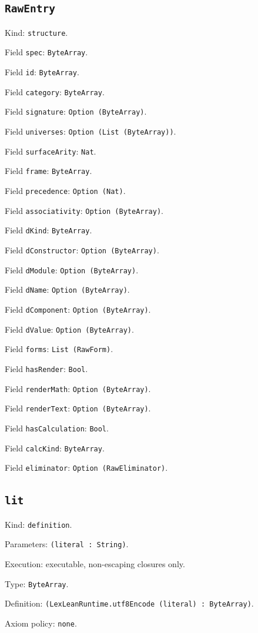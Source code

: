 \documentclass[11pt]{article}
\begin{document}
\subsection*{\texttt{RawEntry}}
\noindent Kind: \texttt{structure}.\par
\noindent Field \texttt{spec}: \texttt{ByteArray}.\par
\noindent Field \texttt{id}: \texttt{ByteArray}.\par
\noindent Field \texttt{category}: \texttt{ByteArray}.\par
\noindent Field \texttt{signature}: \texttt{Option (ByteArray)}.\par
\noindent Field \texttt{universes}: \texttt{Option (List (ByteArray))}.\par
\noindent Field \texttt{surfaceArity}: \texttt{Nat}.\par
\noindent Field \texttt{frame}: \texttt{ByteArray}.\par
\noindent Field \texttt{precedence}: \texttt{Option (Nat)}.\par
\noindent Field \texttt{associativity}: \texttt{Option (ByteArray)}.\par
\noindent Field \texttt{dKind}: \texttt{ByteArray}.\par
\noindent Field \texttt{dConstructor}: \texttt{Option (ByteArray)}.\par
\noindent Field \texttt{dModule}: \texttt{Option (ByteArray)}.\par
\noindent Field \texttt{dName}: \texttt{Option (ByteArray)}.\par
\noindent Field \texttt{dComponent}: \texttt{Option (ByteArray)}.\par
\noindent Field \texttt{dValue}: \texttt{Option (ByteArray)}.\par
\noindent Field \texttt{forms}: \texttt{List (RawForm)}.\par
\noindent Field \texttt{hasRender}: \texttt{Bool}.\par
\noindent Field \texttt{renderMath}: \texttt{Option (ByteArray)}.\par
\noindent Field \texttt{renderText}: \texttt{Option (ByteArray)}.\par
\noindent Field \texttt{hasCalculation}: \texttt{Bool}.\par
\noindent Field \texttt{calcKind}: \texttt{ByteArray}.\par
\noindent Field \texttt{eliminator}: \texttt{Option (RawEliminator)}.\par
\subsection*{\texttt{lit}}
\noindent Kind: \texttt{definition}.\par
\noindent Parameters: \texttt{(literal : String)}.\par
\noindent Execution: executable, non-escaping closures only.\par
\noindent Type: \texttt{ByteArray}.\par
\noindent Definition: \texttt{(LexLeanRuntime.utf8Encode (literal) : ByteArray)}.\par
\noindent Axiom policy: \texttt{none}.\par
\end{document}
